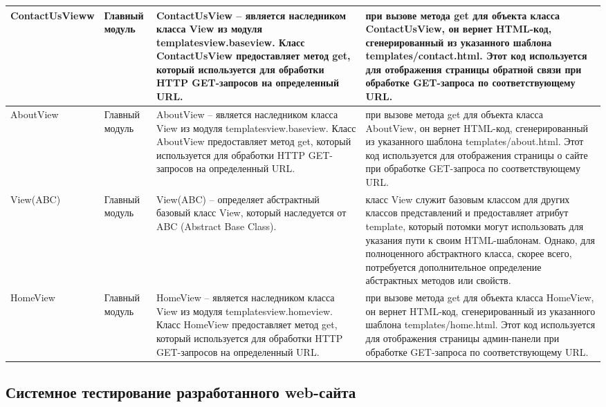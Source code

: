 \begin{xltabular}{\textwidth}{|X|p{2.5cm}|>{\setlength{\baselineskip}{0.7\baselineskip}}p{4.85cm}|>{\setlength{\baselineskip}{0.7\baselineskip}}p{4.85cm}|}
	\hline ContactUsVieww & Главный модуль & ContactUsView – является наследником класса View из модуля templatesview.baseview. Класс ContactUsView предоставляет метод get, который используется для обработки HTTP GET-запросов на определенный URL. & при вызове метода get для объекта класса ContactUsView, он вернет HTML-код, сгенерированный из указанного шаблона templates/contact.html. Этот код используется для отображения страницы обратной связи при обработке GET-запроса по соответствующему URL.\\
	
	\hline AboutView & Главный модуль & AboutView – является наследником класса View из модуля templatesview.baseview. Класс AboutView предоставляет метод get, который используется для обработки HTTP GET-запросов на определенный URL. & при вызове метода get для объекта класса AboutView, он вернет HTML-код, сгенерированный из указанного шаблона templates/about.html. Этот код используется для отображения страницы о сайте при обработке GET-запроса по соответствующему URL.\\
	
	\hline View(ABC) & Главный модуль & View(ABC) – определяет абстрактный базовый класс View, который наследуется от ABC (Abstract Base Class). & класс View служит базовым классом для других классов представлений и предоставляет атрибут template, который потомки могут использовать для указания пути к своим HTML-шаблонам. Однако, для полноценного абстрактного класса, скорее всего, потребуется дополнительное определение абстрактных методов или свойств.\\
	
	\hline HomeView & Главный модуль & HomeView – является наследником класса View из модуля templatesview.homeview. Класс HomeView предоставляет метод get, который используется для обработки HTTP GET-запросов на определенный URL. & при вызове метода get для объекта класса HomeView, он вернет HTML-код, сгенерированный из указанного шаблона templates/home.html. Этот код используется для отображения страницы админ-панели при обработке GET-запроса по соответствующему URL.\\
	
	
\end{xltabular}
\renewcommand{\arraystretch}{1.0} %

\newpage
\subsection{Системное тестирование разработанного web-сайта}

